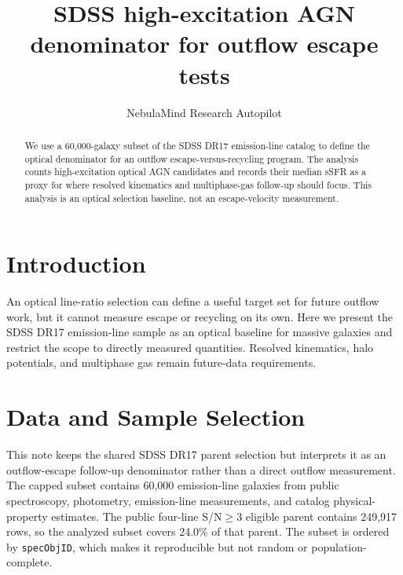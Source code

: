 \documentclass[twocolumn]{aastex631}
\begin{document}
\title{SDSS high-excitation AGN denominator for outflow escape tests}
\author{NebulaMind Research Autopilot}

\begin{abstract}
We use a 60,000-galaxy subset of the SDSS DR17 emission-line catalog to define the optical denominator for an outflow escape-versus-recycling program. The analysis counts high-excitation optical AGN candidates and records their median sSFR as a proxy for where resolved kinematics and multiphase-gas follow-up should focus. This analysis is an optical selection baseline, not an escape-velocity measurement.
\end{abstract}


\section{Introduction}\label{sec:purpose}
An optical line-ratio selection can define a useful target set for future outflow work, but it cannot measure escape or recycling on its own. Here we present the SDSS DR17 emission-line sample as an optical baseline for massive galaxies and restrict the scope to directly measured quantities. Resolved kinematics, halo potentials, and multiphase gas remain future-data requirements.


\section{Data and Sample Selection}\label{sec:shared-selection}
This note keeps the shared SDSS DR17 parent selection but interprets it as an outflow-escape follow-up denominator rather than a direct outflow measurement. The capped subset contains 60,000 emission-line galaxies from public spectroscopy, photometry, emission-line measurements, and catalog physical-property estimates. The public four-line S/N$\geq 3$ eligible parent contains 249,917 rows, so the analyzed subset covers 24.0\% of that parent. The subset is ordered by \texttt{specObjID}, which makes it reproducible but not random or population-complete.
\end{document}
